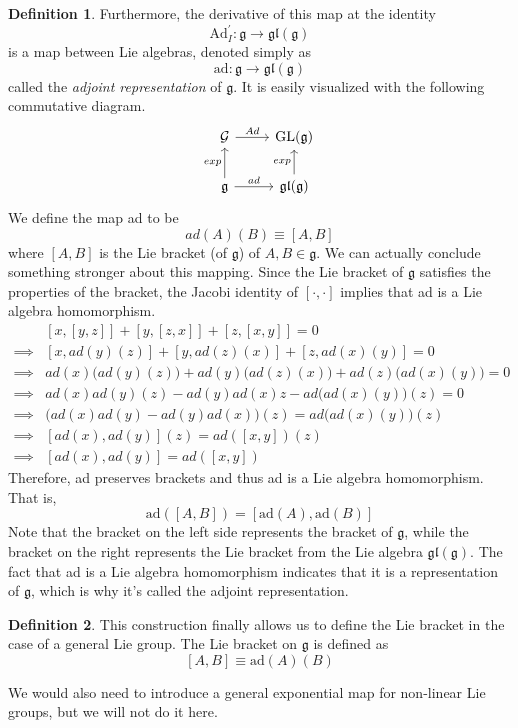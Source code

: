 \documentclass{article}
\DeclareMathOperator{\GL}{GL}
\theoremstyle{remark}
\theoremstyle{definition}
\newtheorem{definition}{Definition}[section]
\begin{document}
\begin{definition}
Furthermore, the derivative of this map at the identity 
\[\text{Ad}_I^\prime: \mathfrak{g} \longrightarrow \mathfrak{gl}(\mathfrak{g})\]
is a map between Lie algebras, denoted simply as 
\[\text{ad}: \mathfrak{g} \longrightarrow \mathfrak{gl}(\mathfrak{g})\]
called the \textit{adjoint representation} of $\mathfrak{g}$. It is easily visualized with the following commutative diagram. 
\[\begin{tikzcd}
\mathcal{G} \arrow{r}{Ad} & \GL(\mathfrak{g}) \\
\mathfrak{g} \arrow{u}{exp} \arrow{r}{ad} & \mathfrak{gl}(\mathfrak{g}) \arrow{u}{exp}
\end{tikzcd}\]
We define the map ad to be 
\[ad(A)(B) \equiv [A,B]\]
where $[A,B]$ is the Lie bracket (of $\mathfrak{g}$) of $A, B \in \mathfrak{g}$. We can actually conclude something stronger about this mapping. Since the Lie bracket of $\mathfrak{g}$ satisfies the properties of the bracket, the Jacobi identity of $[\cdot, \cdot]$ implies that ad is a Lie algebra homomorphism. 
\begin{align*}
    & [x, [y,z]] + [y,[z,x]] + [z, [x,y]] = 0 \\
    \implies & [x, ad(y)(z)] + [y, ad(z)(x)] + [z, ad(x)(y)] = 0 \\
    \implies & ad(x)\big(ad(y)(z)\big) + ad(y) \big( ad(z)(x)\big) + ad(z) \big(ad(x)(y)\big) = 0 \\
    \implies & ad(x) ad(y) (z) - ad(y) ad(x) z - ad \big(ad(x)(y)\big) (z) = 0 \\
    \implies & \big( ad(x) ad(y) - ad(y) ad(x) \big) (z) = ad\big( ad(x)(y) \big) (z) \\
    \implies & [ad(x), ad(y)] (z) = ad ([x,y]) (z) \\
    \implies & [ad(x), ad(y)] = ad([x,y])
\end{align*}
Therefore, ad preserves brackets and thus ad is a Lie algebra homomorphism. That is, 
\[\text{ad}([A,B]) = [\text{ad}(A), \text{ad}(B)]\]
Note that the bracket on the left side represents the bracket of $\mathfrak{g}$, while the bracket on the right represents the Lie bracket from the Lie algebra $\mathfrak{gl}(\mathfrak{g})$. The fact that ad is a Lie algebra homomorphism indicates that it is a representation of $\mathfrak{g}$, which is why it's called the adjoint representation. 
\end{definition}

\begin{definition}
This construction finally allows us to define the Lie bracket in the case of a general Lie group. The Lie bracket on $\mathfrak{g}$ is defined as 
\[[A,B] \equiv \text{ad} (A) (B)\]
\end{definition}

We would also need to introduce a general exponential map for non-linear Lie groups, but we will not do it here. 
\end{document}
